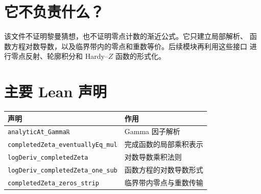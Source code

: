 \documentclass[11pt]{ctexart}
\begin{document}
\section{它不负责什么？}

该文件不证明黎曼猜想，也不证明零点计数的渐近公式。它只建立局部解析、
函数方程对数导数，以及临界带内的零点和重数等价。后续模块再利用这些接口
进行零点反射、轮廓积分和 Hardy--$Z$ 函数的形式化。

\section{主要 Lean 声明}

\begin{center}
\begin{tabular}{ll}
\toprule
声明 & 作用 \\
\midrule
\texttt{analyticAt\_Gammaℝ} & Gamma 因子解析 \\
\texttt{completedZeta\_eventuallyEq\_mul} & 完成函数的局部乘积表示 \\
\texttt{logDeriv\_completedZeta} & 对数导数乘积法则 \\
\texttt{logDeriv\_completedZeta\_one\_sub} & 函数方程的对数导数形式 \\
\texttt{completedZeta\_zeros\_strip} & 临界带内零点与重数传输 \\
\bottomrule
\end{tabular}
\end{center}
\end{document}
